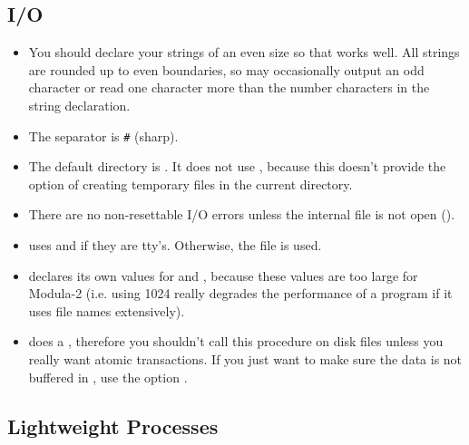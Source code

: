 \subsection{I/O}
\begin{itemize}
\item
    You should declare your strings of an even size so that 
     works well.  All strings are rounded up to
    even boundaries, so  may occasionally
    output an odd character or read one character more than
    the number characters in the string
    declaration. 
\item
    The  separator is \verb!#! (sharp).
\item
    The  default directory is .
    It does not use , because this doesn't provide
    the option of creating temporary files in the current directory.
    
\item
    There are no non-resettable I/O errors unless the internal file
    is not open ().
    
\item
     uses  and 
     if they are tty's.  Otherwise,
    the file  is used. 

\item
     declares its own values for  and
    , because these values are too large for Modula-2
    (i.e. using 1024 really degrades the performance of a program if
    it uses file names extensively).
\item
     does a , therefore you shouldn't
    call this procedure on disk files unless you really want atomic
    transactions.  If you just want to make sure the data is not buffered
    in , use the option .
\end{itemize}

\subsection{Lightweight Processes}


